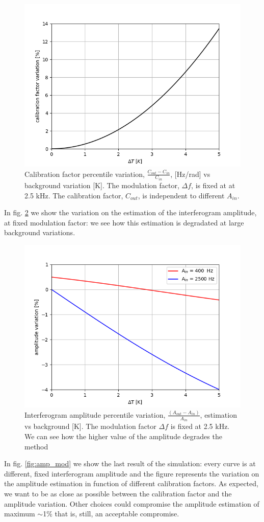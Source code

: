 \documentclass[twocolumn,traditabstract]{aa}\\
\begin{document}
\begin{figure}[htf]
	\centering
	\includegraphics[width=.5\textwidth]{3.acqui/calibration_factor_variation.png}
	\caption{Calibration factor percentile variation, $\frac{C_{out}-C_{in}}{C_{in}}$, [Hz/rad] vs background variation [K]. The modulation factor, $\Delta f$, is fixed at at 2.5 kHz. The calibration factor, $C_{out}$, is independent to different $A_{in}$.}
	\label{fig:cal_bck}
\end{figure}

\noindent In fig. \ref{fig:amp_bck} we show the variation on the estimation of the interferogram amplitude, at fixed modulation factor: we see how this estimation is degradated at large background variations.

\begin{figure}[htf]
	\centering
	\includegraphics[width=.5\textwidth]{3.acqui/amplitude_variation.png}
	\caption{Interferogram amplitude percentile variation, $\frac{(A_{out}-A_{in})}{A_{in}}$, estimation vs background [K]. The modulation factor $\Delta f$ is fixed at 2.5 kHz. We can see how the higher value of the amplitude degrades the method}
	\label{fig:amp_bck}
\end{figure}

\noindent In fig. \ref{fig:amp_mod} we show the last result of the simulation: every curve is at different, fixed interferogram amplitude and the figure represents the variation on the amplitude estimation in function of different calibration factors. As expected, we want to be as close as possible between the calibration factor and the amplitude variation. Other choices could compromise the amplitude estimation of maximum $\sim$1\% that is, still, an acceptable compromise.
\end{document}
